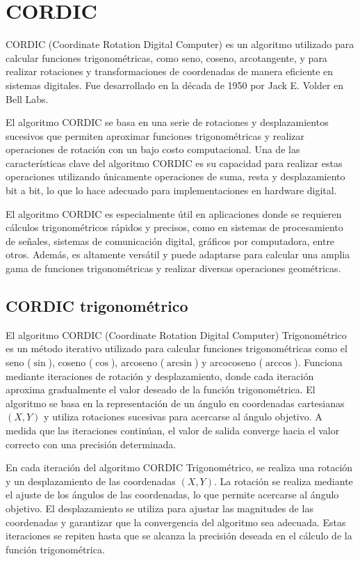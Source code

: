 \documentclass[12pt,a4paper, twoside]{article} %
\begin{document}
\section{CORDIC}
\label{sec:orgc1c4017}

CORDIC (Coordinate Rotation Digital Computer) es un algoritmo utilizado para calcular funciones trigonométricas, como seno, coseno, arcotangente, y para realizar rotaciones y transformaciones de coordenadas de manera eficiente en sistemas digitales. Fue desarrollado en la década de 1950 por Jack E. Volder en Bell Labs.

El algoritmo CORDIC se basa en una serie de rotaciones y desplazamientos sucesivos que permiten aproximar funciones trigonométricas y realizar operaciones de rotación con un bajo costo computacional. Una de las características clave del algoritmo CORDIC es su capacidad para realizar estas operaciones utilizando únicamente operaciones de suma, resta y desplazamiento bit a bit, lo que lo hace adecuado para implementaciones en hardware digital.

El algoritmo CORDIC es especialmente útil en aplicaciones donde se requieren cálculos trigonométricos rápidos y precisos, como en sistemas de procesamiento de señales, sistemas de comunicación digital, gráficos por computadora, entre otros. Además, es altamente versátil y puede adaptarse para calcular una amplia gama de funciones trigonométricas y realizar diversas operaciones geométricas.



\subsection{CORDIC trigonométrico}
\label{sec:orgdaca22c}


El algoritmo CORDIC (Coordinate Rotation Digital Computer) Trigonométrico es un método iterativo utilizado para calcular funciones trigonométricas como el seno ($\sin$), coseno ($\cos$), arcoseno ($\arcsin$) y arcocoseno ($\arccos$). Funciona mediante iteraciones de rotación y desplazamiento, donde cada iteración aproxima gradualmente el valor deseado de la función trigonométrica. El algoritmo se basa en la representación de un ángulo en coordenadas cartesianas $(X, Y)$ y utiliza rotaciones sucesivas para acercarse al ángulo objetivo. A medida que las iteraciones continúan, el valor de salida converge hacia el valor correcto con una precisión determinada.

En cada iteración del algoritmo CORDIC Trigonométrico, se realiza una rotación y un desplazamiento de las coordenadas $(X, Y)$. La rotación se realiza mediante el ajuste de los ángulos de las coordenadas, lo que permite acercarse al ángulo objetivo. El desplazamiento se utiliza para ajustar las magnitudes de las coordenadas y garantizar que la convergencia del algoritmo sea adecuada. Estas iteraciones se repiten hasta que se alcanza la precisión deseada en el cálculo de la función trigonométrica.
\end{document}
